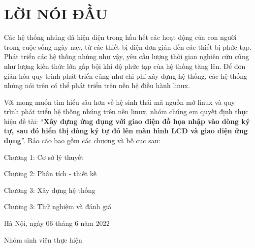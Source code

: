 
\chapter*{LỜI NÓI ĐẦU}
{}


Các hệ thống nhúng đã hiện diện trong hầu hết các hoạt động của con người trong cuộc sống ngày nay, từ các thiết bị điện đơn giản đến các thiết bị phức tạp. Phát triển các hệ thống nhúng như vậy, yêu cầu lượng thời gian nghiên cứu cũng như lượng kiến thức lớn gấp bội khi độ phức tạp của hệ thống tăng lên. Để đơn giản hóa quy trình phát triển cũng như chi phí xây dựng hệ thống, các hệ thống nhúng nói trên có thể phát triển trên nền hệ điều hành linux.


Với mong muốn tìm hiểu sâu hơn về hệ sinh thái mã nguồn mở linux và quy trình phát triển hệ thống nhúng trên nền linux, nhóm chúng em quyết định thực hiện đề tài: “\textbf{Xây dựng ứng dụng với giao diện đồ họa nhập vào dòng ký tự, sau đó hiển thị dòng ký tự đó lên màn hình LCD và giao diện ứng dụng}”. Báo cáo bao gồm các chương và bố cục sau:

\hspace{1cm}Chương 1: Cơ sở lý thuyết

\hspace{1cm}Chương 2: Phân tích - thiết kế

\hspace{1cm}Chương 3: Xây dựng hệ thống

\hspace{1cm}Chương 3: Thử nghiệm và đánh giá

\vspace{0.5cm}

\hspace{6cm}Hà Nội, ngày 06 tháng 6 năm 2022

\vspace{2cm}

\hspace{7cm}Nhóm sinh viên thực hiện

